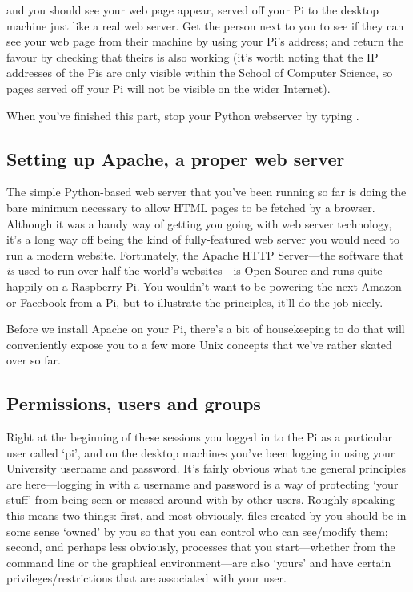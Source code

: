 and you should see your web page appear, served off your Pi to the
desktop machine just like a real web server. Get the person next to
you to see if they can see your web page from their machine by using
your Pi's address; and return the favour by checking that theirs is
also working (it's worth noting that the IP addresses of the Pis are
only visible within the School of Computer Science, so pages served
off your Pi will not be visible on the wider Internet).

When you've finished this part, stop your Python webserver by typing
.

\subsection{Setting up Apache, a proper web server}

The simple Python-based web server that you've been running so far is
doing the bare minimum necessary to allow HTML pages to be fetched by
a browser. Although it was a handy way of getting you going with web
server technology, it's a long way off being the kind of
fully-featured web server you would need to run a modern
website. Fortunately, the Apache HTTP Server---the software that
\textit{is} used to run over half the world's websites---is Open
Source and runs quite happily on a Raspberry Pi. You wouldn't want to
be powering the next Amazon or Facebook from a Pi, but to illustrate the
principles, it'll do the job nicely.

Before we install Apache on your Pi, there's a bit of housekeeping to
do that will conveniently expose you to a few more Unix concepts that
we've rather skated over so far.

\subsection{Permissions, users and groups}

Right at the beginning of these sessions you logged in to the Pi as a
particular user called `pi', and on the desktop machines you've been
logging in using your University username and password. It's fairly
obvious what the general principles are here---logging in with a
username and password is a way of protecting `your stuff' from being
seen or messed around with by other users. Roughly speaking this means
two things: first, and most obviously, files created by you should be
in some sense `owned' by you so that you can control who can
see/modify them; second, and perhaps less obviously, processes that
you start---whether from the command line or the graphical
environment---are also `yours' and have certain
privileges/restrictions that are associated with your user.

